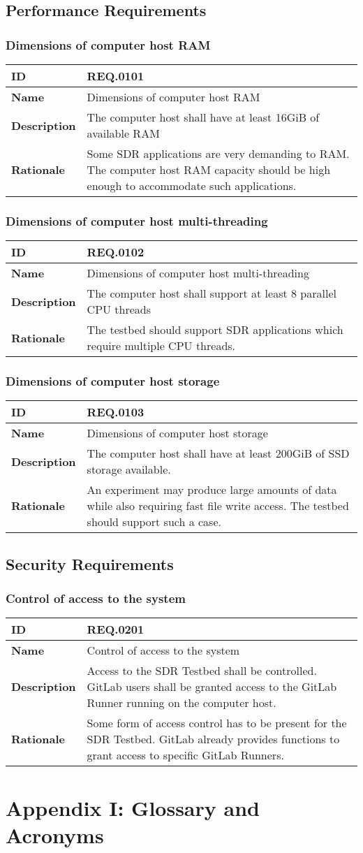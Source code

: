 \documentclass[english,titlepage,a4paper]{report}
\newcommand{\requirement}[5]{
  \subsection{#2}
  #5

  \noindent
  \begin{tabular}{|l|p{9cm}|}
    \hline
    \textbf{ID} & #1 \\
    \hline
    \textbf{Name} & #2 \\
    \hline
    \textbf{Description} & #3 \\
    \hline
    \textbf{Rationale} & #4 \\
    \hline
  \end{tabular}
}
\begin{document}
\section{Performance Requirements}

\requirement{REQ.0101}{Dimensions of computer host RAM}{
  The computer host shall have at least 16GiB of available RAM
}{
  Some SDR applications are very demanding to RAM.
  The computer host RAM capacity should be high enough to accommodate such applications.
}{}
\requirement{REQ.0102}{Dimensions of computer host multi-threading}{
  The computer host shall support at least 8 parallel CPU threads
}{
  The testbed should support SDR applications which require multiple CPU threads.
}{}
\requirement{REQ.0103}{Dimensions of computer host storage}{
  The computer host shall have at least 200GiB of SSD storage available.
}{
  An experiment may produce large amounts of data while also requiring fast file write access.
  The testbed should support such a case.
}{}

\section{Security Requirements}

\requirement{REQ.0201}{Control of access to the system}{
  Access to the SDR Testbed shall be controlled.
  GitLab users shall be granted access to the GitLab Runner running on the computer host.
}{
  Some form of access control has to be present for the SDR Testbed.
  GitLab already provides functions to grant access to specific GitLab Runners.
}{}


\chapter*{Appendix I: Glossary and Acronyms}

\printglossary
\printglossary[type=\acronymtype]
\end{document}
